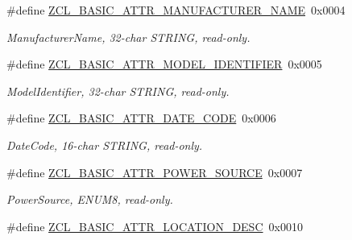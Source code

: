 \begin{DoxyCompactItemize}
\mbox{\label{group__zcl__basic_ga4d657421aaf3ce5419e0e5d9ff6efcda}} 
\#define \hyperlink{group__zcl__basic_ga4d657421aaf3ce5419e0e5d9ff6efcda}{Z\+C\+L\+\_\+\+B\+A\+S\+I\+C\+\_\+\+A\+T\+T\+R\+\_\+\+M\+A\+N\+U\+F\+A\+C\+T\+U\+R\+E\+R\+\_\+\+N\+A\+ME}~0x0004
\begin{DoxyCompactList}\small\item\em Manufacturer\+Name, 32-\/char S\+T\+R\+I\+NG, read-\/only. \end{DoxyCompactList}\item 
\mbox{\label{group__zcl__basic_gad6e74db6f2936706976045dee1c43cf2}} 
\#define \hyperlink{group__zcl__basic_gad6e74db6f2936706976045dee1c43cf2}{Z\+C\+L\+\_\+\+B\+A\+S\+I\+C\+\_\+\+A\+T\+T\+R\+\_\+\+M\+O\+D\+E\+L\+\_\+\+I\+D\+E\+N\+T\+I\+F\+I\+ER}~0x0005
\begin{DoxyCompactList}\small\item\em Model\+Identifier, 32-\/char S\+T\+R\+I\+NG, read-\/only. \end{DoxyCompactList}\item 
\mbox{\label{group__zcl__basic_gadfa72f9d6ff3d467de6a51314ab2cce8}} 
\#define \hyperlink{group__zcl__basic_gadfa72f9d6ff3d467de6a51314ab2cce8}{Z\+C\+L\+\_\+\+B\+A\+S\+I\+C\+\_\+\+A\+T\+T\+R\+\_\+\+D\+A\+T\+E\+\_\+\+C\+O\+DE}~0x0006
\begin{DoxyCompactList}\small\item\em Date\+Code, 16-\/char S\+T\+R\+I\+NG, read-\/only. \end{DoxyCompactList}\item 
\mbox{\label{group__zcl__basic_ga566025cbf5bb2560164d45c221226844}} 
\#define \hyperlink{group__zcl__basic_ga566025cbf5bb2560164d45c221226844}{Z\+C\+L\+\_\+\+B\+A\+S\+I\+C\+\_\+\+A\+T\+T\+R\+\_\+\+P\+O\+W\+E\+R\+\_\+\+S\+O\+U\+R\+CE}~0x0007
\begin{DoxyCompactList}\small\item\em Power\+Source, E\+N\+U\+M8, read-\/only. \end{DoxyCompactList}\item 
\mbox{\label{group__zcl__basic_ga6fde53674c021d134286c43d77514a22}} 
\#define \hyperlink{group__zcl__basic_ga6fde53674c021d134286c43d77514a22}{Z\+C\+L\+\_\+\+B\+A\+S\+I\+C\+\_\+\+A\+T\+T\+R\+\_\+\+L\+O\+C\+A\+T\+I\+O\+N\+\_\+\+D\+E\+SC}~0x0010

\end{DoxyCompactItemize}
